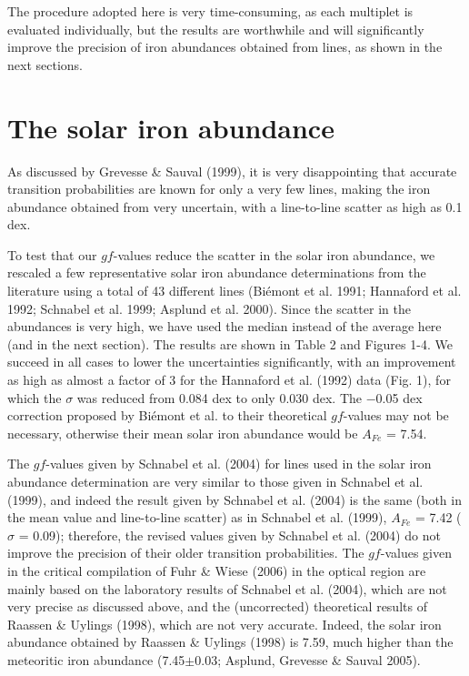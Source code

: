 \documentclass[traditabstract]{aa} %
\begin{document}
The procedure adopted here is very time-consuming, as each
multiplet is evaluated individually, but the results are worthwhile
and will significantly improve the precision of iron abundances 
obtained from  lines, as shown in the next sections. 



\section{The solar iron abundance}

As discussed by Grevesse \& Sauval (1999), it is very disappointing
that accurate transition probabilities are known for only a very
few  lines, making the iron abundance obtained 
from  very uncertain, with a line-to-line scatter
as high as 0.1 dex. 

To test that our $gf$-values reduce the scatter in
the solar iron abundance, we rescaled a 
few representative solar iron abundance determinations from the literature
using a total of 43 different  lines 
(Bi\'emont et al. 1991; Hannaford et al. 1992; 
Schnabel et al. 1999; Asplund et al. 2000).
Since the scatter in the abundances is very high, we have used 
the median instead of the average here 
(and in the next section).
The results are shown in Table 2 and Figures 1-4. We succeed in all
cases to lower the uncertainties significantly, with an improvement
as high as almost a factor of 3 for the Hannaford et al. (1992) data (Fig. 1),
for which the $\sigma$ was reduced from 0.084 dex to only 0.030 dex.
The $-$0.05 dex correction proposed by Bi\'emont et al.
to their theoretical $gf$-values may not be necessary,
otherwise their mean solar iron abundance would be $A_{Fe}$ = 7.54.

The $gf$-values given by Schnabel et al. (2004) for lines used
in the solar iron abundance determination are very similar
to those given in Schnabel et al. (1999), and indeed the result
given by Schnabel et al. (2004) is the same (both in the
mean value and line-to-line scatter) as in
Schnabel et al. (1999), $A_{Fe}$ = 7.42 ($\sigma$ = 0.09); 
therefore, the revised values given by Schnabel et al. (2004) do not
improve the precision of their older transition probabilities.
The $gf$-values given in the critical compilation of Fuhr \& Wiese (2006)
in the optical region are mainly based on the laboratory results
of Schnabel et al. (2004), which are not very precise as discussed above,
and the (uncorrected) theoretical results of Raassen \& Uylings (1998), which 
are not very accurate. Indeed, the solar iron abundance obtained by
Raassen \& Uylings (1998) is 7.59, much higher than the meteoritic
iron abundance (7.45$\pm$0.03; Asplund, Grevesse \& Sauval 2005).
\end{document}
